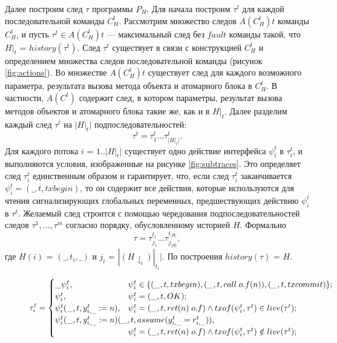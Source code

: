 \begin{myproof}
Далее построим след $\tau$ программы $P_H$. Для начала построим $\tau^t$ для каждой последовательной команды $C^t_H$. Рассмотрим множество следов $A(C^t_H)t$ команды $C^t_H$, и пусть $\tau^t \in A(C^t_H)t$ --- максимальный след без $fault$ команды такой, что $H|_t$ = $history(\tau^t)$. След $\tau^t$ существует в связи с конструкцией $C^t_H$ и определением множества следов последовательной команды (рисунок \ref{fig:actions}). Во множестве $A(C^t_H)t$ существует след для каждого возможного параметра, результата вызова метода объекта и атомарного блока в $C^t_H$. В частности, $A(C^t)$ содержит след, в котором параметры, результат вызова методов объектов и атомарного блока такие же, как и в $H|_t$. Далее разделим каждый след $\tau^t$ на $|H|_t|$ подпоследовательностей: 
\begin{equation}\label{eq:tau_t}
\tau^t = \tau^t_1\ldots\tau^t_{|H|_t|}.
\end{equation}
Для каждого потока $i$ = $1..|H|_t|$ существует одно действие интерфейса $\psi^t_i$ в $\tau^t_i$, и выполняются условия, изображенные на рисунке \ref{fig:subtraces}. Это определяет след $\tau^t_i$ единственным образом и гарантирует, что, если след $\tau^t_i$ заканчивается $\psi^t_i = (\_,t,txbegin)$, то он содержит все действия, которые используются для чтения сигнализирующих глобальных переменных, предшествующих действию $\psi^t_i$ в $\tau^t$. Желаемый след строится с помощью чередования подпоследовательностей следов $\tau^1,\ldots,\tau^m$ согласно порядку, обусловленному историей $H$. Формально 
\begin{equation}\label{eq:tau}
\tau = \tau^{t_1}_{j_1} \ldots \tau^{t_{|H|}}_{j_{|H|}},
\end{equation}
где $H(i)$ = $(\_, t_i, \_)$ и $j_i$ = $|(H \downharpoonleft_i)|_{t_i}|.$ По построения $history(\tau)$ = $H$.
\begin{figure}
\begin{align*}
  \tau^t_i=\begin{cases}
    \_\psi^t_i, & \psi^t_i \in \{(\_,t,txbegin), (\_,t,call \; o.f(n)), (\_,t, txcommit)\};\\
    \psi^t_i, & \psi^t_i = (\_,t, OK); \\
    \psi^t_i(\_,t,y^t_{i,\_} := n), & \psi^t_i = (\_,t, ret(n) \; o.f) \land txof(\psi^t_i, \tau^t) \in live(\tau^t); \\
    \mathrlap{\psi^t_i(\_,t,y^t_{i,\_} := n)(\_,t,assume(y^t_{i,\_} = r^t_{i,\_})),}\\
                                    & \psi^t_i = (\_,t, ret(n) \; o.f) \land txof(\psi^t_i, \tau^t) \notin live(\tau^t); \\

\end{cases}
\end{align*}
\end{figure}
\end{myproof}
